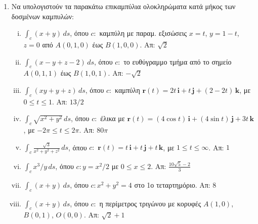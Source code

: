 



\pagestyle{askhseis}
\everymath{\displaystyle}



\begin{center}
\minibox{\large\bfseries \textcolor{Col1}{Επικαμπύλιο Ολοκλήρωμα Ιου είδους}}
\end{center}

\vspace{\baselineskip}

\begin{enumerate}
  \item Να υπολογιστούν τα παρακάτω επικαμπύλια ολοκληρώματα κατά μήκος των 
    δοσμένων καμπυλών:
    \begin{enumerate}[i)]
      \item $ \int _{c} (x+y) \,{ds} $, όπου $ c \colon $ καμπύλη με 
        παραμ. εξισώσεις $ x=t $, $ y=1-t $, $ z=0 $ από $ A(0,1,0) $ έως $B(1,0,0)$. 
        \hfill Απ: $ \sqrt{2} $ 
      \item $ \int _{c} (x-y+z-2) \,{ds} $, όπου $ c \colon $ το ευθύγραμμο τμήμα 
        από το σημείο $ A(0,1,1) $ έως $ B(1,0,1) $.
        \hfill Απ: $ -\sqrt{2} $ 
      \item $ \int _{c} (xy+y+z) \,{ds} $, όπου $ c \colon $ καμπύλη 
        $ \mathbf{r}(t)=2t\, \mathbf{i} + t\, \mathbf{j} + (2-2t) \, \mathbf{k} $, 
        με $ 0 \leq t \leq 1 $.  
        \hfill Απ: $13/2$ 
      \item $ \int _{c} \sqrt{x^{2}+y^{2}} \,{ds} $, όπου $ c \colon $ έλικα με 
        $ \mathbf{r}(t)=(4 \cos{t} )\, \mathbf{i} + (4 \sin{t})\, \mathbf{j} + 3t \, 
        \mathbf{k} $, με $ -2 \pi \leq t \leq 2 \pi $.  
        \hfill Απ: $80 \pi$ 
      \item $ \int _{c} \frac{\sqrt{3}}{x^{2}+y^{2}+z^{2}}\,{ds} $, όπου $ c \colon $ 
        $ \mathbf{r}(t)= t\, \mathbf{i} + t\, \mathbf{j} + t\, 
        \mathbf{k} $, με $1 \leq t \leq \infty$.  
        \hfill Απ: $1$ 
      \item $ \int _{c} x^{3}/y \,{ds} $, όπου $ c \colon y=x^{2}/2 $ με 
        $0 \leq x \leq 2$.  
        \hfill Απ: $ \frac{10 \sqrt{5} -2}{3} $ 
      \item $ \int _{c} (x+y) \,{ds} $, όπου $ c \colon x^{2}+y^{2}=4 $ στο 1ο
        τεταρτημόριο.  \hfill Απ: $8$ 
      \item $ \int _{c} (x+y) \,{ds} $, όπου $ c \colon $ η περίμετρος τριγώνου 
        με κορυφές $ A(1,0) $, $ B(0,1) $, $ O(0,0) $.
        \hfill Απ: $ \sqrt{2} +1 $ 


\end{enumerate}
\end{enumerate}
